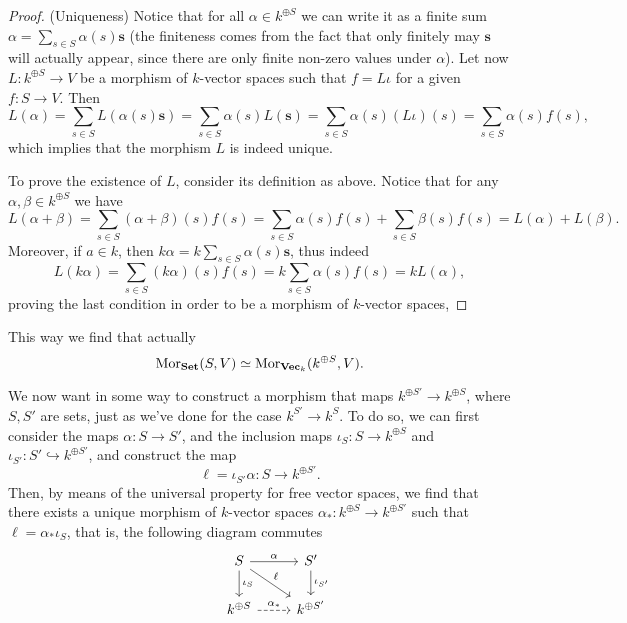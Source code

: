 \begin{proof}
   (Uniqueness) Notice that for all \(\alpha \in k^{\oplus S}\) we can write it
   as a finite sum \(\alpha = \sum_{s \in S}\alpha(s) \mathbf s\) (the
   finiteness comes from the fact that only finitely may \(\mathbf s\) will
   actually appear, since there are only finite non-zero values under
   \(\alpha\)). Let now  \(L : k^{\oplus S} \to V\) be a morphism of
   \(k\)-vector spaces such that \(f = L  \iota\) for a given \(f : S \to
   V\). Then
   \[
      L(\alpha) = \sum_{s \in S} L(\alpha(s) \mathbf{s}) = \sum_{s \in S}
      \alpha(s) L(\mathbf s) = \sum_{s \in S} \alpha(s) (L  \iota)(s)
      = \sum_{s \in S} \alpha(s) f(s),
   \]
   which implies that the morphism \(L\) is indeed unique.

   To prove the existence of \(L\), consider its definition as above. Notice
   that for any \(\alpha, \beta \in k^{\oplus S}\) we have
   \[
      L(\alpha + \beta) = \sum_{s \in S} (\alpha + \beta)(s) f(s) = \sum_{s \in
      S} \alpha(s)f(s) + \sum_{s \in S} \beta(s)f(s) = L(\alpha) + L(\beta).
   \]
   Moreover, if \(a \in k\), then \(k \alpha = k\sum_{s \in S} \alpha(s)
   \mathbf s\), thus indeed
   \[
      L(k \alpha) = \sum_{s \in S} (k \alpha)(s) f(s) = k \sum_{s \in S}
      \alpha(s) f(s) = k L(\alpha),
   \]
   proving the last condition in order to be a morphism of \(k\)-vector spaces,
\end{proof}

This way we find that actually
\[
   \operatorname{Mor}_{{\textbf{Set}}}(S, V) \simeq \operatorname{Mor}_{{\textbf{Vec}}_k}(k^{\oplus S}, V).
\]

We now want in some way to construct a morphism that maps \(k^{\oplus S'} \to
k^{\oplus S}\), where \(S, S'\) are sets, just as we've done for the case
\(k^{S'} \to k^S\). To do so, we can first consider the maps \(\alpha: S \to
S'\), and the inclusion maps \(\iota_S : S \to k^{\oplus S}\) and \(\iota_{S'} :
S' \hookrightarrow k^{\oplus S'}\), and construct the map
\[
   \ell = \iota_{S'}  \alpha : S \to k^{\oplus S'}.
\]
Then, by means of the universal property for free vector spaces, we find that
there exists a unique morphism of \(k\)-vector spaces \(\alpha_\ast : k^{\oplus
S} \to k^{\oplus S'} \) such that \(\ell = \alpha_\ast  \iota_S\), that is,
the following diagram commutes
\[
   \begin{tikzcd}
      &S \arrow[r, "\alpha"] \arrow[d, "\iota_S"] \arrow[dr, "\ell"]
      &S' \arrow[d, "\iota_{S'}"]
      \\
      &k^{\oplus S} \arrow[r, dashed, "\alpha_\ast"]
      &k^{\oplus S'}
   \end{tikzcd}
\]

